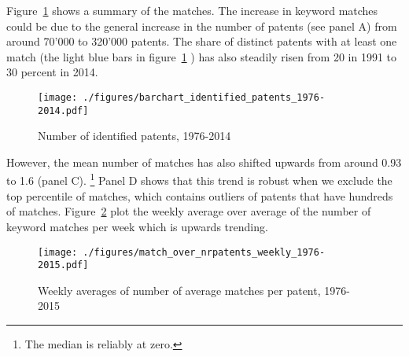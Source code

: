 \documentclass[11pt,a4paper]{article}
\begin{document}
Figure~\ref{fig:summary_stats} shows a summary of the matches. The increase in keyword matches could be due to the general increase in the number of patents (see panel A) from around 70'000 to 320'000 patents. The share of distinct patents with at least one match (the light blue bars in figure~\ref{fig:summary_stats} ) has also steadily risen from 20 in 1991 to 30 percent in 2014. 


\begin{figure}[tb]
\caption{Number of identified patents, 1976-2014}
	\texttt{[image: ./figures/barchart\_identified\_patents\_1976-2014.pdf]}
	\label{fig:summary_stats}
\end{figure}





However, the mean number of matches has also shifted upwards from around 0.93 to 1.6 (panel C). \footnote{The median is reliably at zero.} Panel D shows that this trend is robust when we exclude the top percentile of matches, which contains outliers of patents that have hundreds of matches. Figure~\ref{fig:match_per_nrpatents} plot the weekly average over average of the number of keyword matches per week which is upwards trending. 


\begin{figure}[tb]
\caption{Weekly averages of number of average matches per patent, 1976-2015}
	\centering
	\texttt{[image: ./figures/match\_over\_nrpatents\_weekly\_1976-2015.pdf]}
	\label{fig:match_per_nrpatents}
\end{figure}
\end{document}
